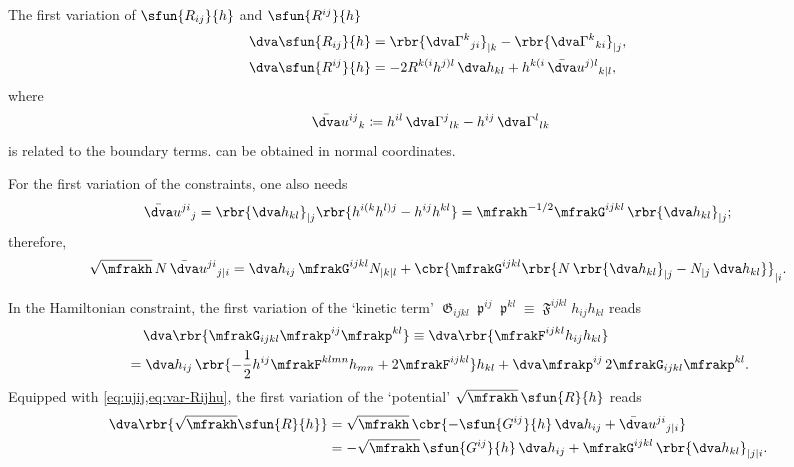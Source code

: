 \documentclass[a4paper,11pt]{article}
\begin{document}
The first variation of $\sfun{R_{ij}}{h}$ and $\sfun{R^{ij}}{h}$
\begin{align}
\dva \sfun{R_{ij}}{h} &=
\rbr{\dva\Gamma^k{}_{ji}}_{|k} - \rbr{\dva\Gamma^k{}_{ki}}_{|j},
\label{eq:var-R_{ij}}
\\
\dva \sfun{R^{ij}}{h} &=
-2R^{k(i}h^{j)l}\,\dva h_{kl} + h^{k(i}\,\bar{\dva}u^{j)l}{}_{k|l},
\label{eq:var-Rijhu}
\end{align}
where
\begin{align}
\bar{\dva}u^{ij}{}_{k} &\coloneqq
h^{il}\,\dva\Gamma^{j}{}_{lk} - h^{ij}\,\dva\Gamma^{l}{}_{lk}
\end{align}
is related to the boundary terms.  can be obtained in 
normal 
coordinates.

For the first variation of the constraints, one also needs
\begin{align}
\bar{\dva}u^{ji}{}_{j} = \rbr{\dva h_{kl}}_{|j}
\rbr{h^{i(k}h^{l)j}-h^{ij}h^{kl}}
= \mfrakh^{-1/2}\mfrakG^{ijkl}\,\rbr{\dva h_{kl}}_{|j};
\label{eq:ujij}
\end{align}
therefore, 
\begin{align}
\sqrt{\mfrakh}\,N \,\bar{\dva}u^{ji}{}_{j|i} =
\dva h_{ij}\,\mfrakG^{ijkl}N_{|k|l}
+\cbr{\mfrakG^{ijkl}
\rbr{N\,\rbr{\dva h_{kl}}_{|j} - N_{|j}\,\dva h_{kl}} }_{|i}.
\end{align}

In the Hamiltonian constraint, the first variation of the `kinetic term'
$\mfrakG_{ijkl}\mfrakp^{ij}\mfrakp^{kl} \equiv
\mfrakF^{ijkl}h_{ij}h_{kl}$ reads
\begin{align}
&\quad\,\dva\rbr{ \mfrakG_{ijkl} \mfrakp^{ij}\mfrakp^{kl}}
\equiv \dva\rbr{\mfrakF^{ijkl}h_{ij}h_{kl}}
\nonumber \\
&=\dva h_{ij}\,\rbr{-\frac{1}{2} h^{ij} \mfrakF^{klmn} h_{mn}
+ 2 \mfrakF^{ijkl} } h_{kl} 
+\dva \mfrakp^{ij}\,2 \mfrakG_{ijkl}\mfrakp^{kl}.
\end{align}
Equipped with \cref{eq:ujij,eq:var-Rijhu}, the first variation of the 
`potential' 
$\sqrt{\mfrakh} \,\sfun{R}{h}$ reads
\begin{align}
\dva\rbr{\sqrt{\mfrakh}\sfun{R}{h}} &= \sqrt{\mfrakh}\,
\cbr{-\sfun{G^{ij}}{h}\,\dva h_{ij} +
\bar{\dva}u^{ji}{}_{j|i}}
\nonumber \\
&= -\sqrt{\mfrakh}\,\sfun{G^{ij}}{h}\,\dva h_{ij} +
\mfrakG^{ijkl}\,\rbr{\dva h_{kl}}_{|j|i}.
\end{align}
\end{document}
